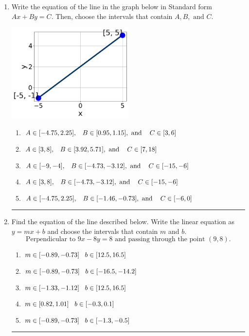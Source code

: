 \documentclass[14pt]{extbook}
\newcommand{\litem}[1]{\item#1\hspace*{-1cm}\rule{\textwidth}{0.4pt}}
\begin{document}
\begin{enumerate}
{\begin{enumerate}[label=\Alph*.]
\end{enumerate} }
\litem{
Write the equation of the line in the graph below in Standard form $Ax+By=C$. Then, choose the intervals that contain $A, B, \text{ and } C$.
\begin{center}
    \includegraphics[width=0.5\textwidth]{../Figures/linearGraphToStandardCopyB.png}
\end{center}
\begin{enumerate}[label=\Alph*.]
\item \( A \in [-4.75, 2.25], \hspace{3mm} B \in [0.95, 1.15], \text{ and } \hspace{3mm} C \in [3, 6] \)
\item \( A \in [3, 8], \hspace{3mm} B \in [3.92, 5.71], \text{ and } \hspace{3mm} C \in [7, 18] \)
\item \( A \in [-9, -4], \hspace{3mm} B \in [-4.73, -3.12], \text{ and } \hspace{3mm} C \in [-15, -6] \)
\item \( A \in [3, 8], \hspace{3mm} B \in [-4.73, -3.12], \text{ and } \hspace{3mm} C \in [-15, -6] \)
\item \( A \in [-4.75, 2.25], \hspace{3mm} B \in [-1.46, -0.73], \text{ and } \hspace{3mm} C \in [-6, 0] \)

\end{enumerate} }
\litem{
Find the equation of the line described below. Write the linear equation as $ y=mx+b $ and choose the intervals that contain $m$ and $b$.\[ \text{Perpendicular to } 9 x - 8 y = 8 \text{ and passing through the point } (9, 8). \]\begin{enumerate}[label=\Alph*.]
\item \( m \in [-0.89, -0.73] \hspace*{3mm} b \in [12.5, 16.5] \)
\item \( m \in [-0.89, -0.73] \hspace*{3mm} b \in [-16.5, -14.2] \)
\item \( m \in [-1.33, -1.12] \hspace*{3mm} b \in [12.5, 16.5] \)
\item \( m \in [0.82, 1.01] \hspace*{3mm} b \in [-0.3, 0.1] \)
\item \( m \in [-0.89, -0.73] \hspace*{3mm} b \in [-1.3, -0.5] \)


\end{enumerate}}
\end{enumerate}
\end{document}

